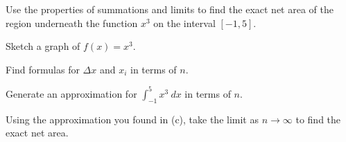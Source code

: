 
\begin{activity} \label{A:4.3.4} %
Use the properties of summations and limits to find the exact net area of the region underneath the function $x^3$ on the interval $[-1,5]$.

\ba
\item Sketch a graph of $f(x) = x^3$.
\item Find formulas for $\Delta x$ and $x_i$ in terms of $n$.
\item Generate an approximation for $\int_{-1}^{5} x^3 \ dx$ in terms of $n$.
\item Using the approximation you found in (c), take the limit as $n \to \infty$ to find the exact net area.
\ea
\end{activity}